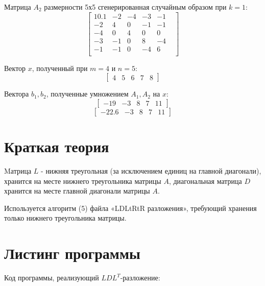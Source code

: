 \documentclass[12pt]{report}
\begin{document}
Матрица $A_{2}$ размерности 5х5 сгенерированная случайным образом при $k = 1$:
\[
\begin{bmatrix}
      10.1 &        -2 &        -4 &        -3 &        -1 & \\
        -2 &         4 &         0 &        -1 &        -1 & \\ 
        -4 &         0 &         4 &         0 &         0 & \\ 
        -3 &        -1 &         0 &         8 &        -4 & \\ 
        -1 &        -1 &         0 &        -4 &         6 & \\
\end{bmatrix}
\]

Вектор $x$, полученный при $m = 4$ и $n = 5$:
\[
\begin{bmatrix}
   4 & 5 & 6 & 7 & 8   
\end{bmatrix}
\]

Вектора $b_{1}, b_{2}$, полученные умножением $A_{1}, A_{2}$ на $x$:
\[
\begin{bmatrix}
   -19 & -3 & 8 & 7 & 11
\end{bmatrix}
\]
\[
\begin{bmatrix}
   -22.6 & -3 & 8 & 7 & 11  
\end{bmatrix}
\]

\section{Краткая теория}

Mатрица $L$ - нижняя треугольная (за исключением единиц на главной диагонали), хранится на месте нижнего треугольника матрицы $A$, диагональная матрица $D$ хранится на месте главной диагонали матрицы $A$.

Используется алгоритм (5) файла «LDLtRtR разложения», требующий хранения только нижнего треугольника матрицы.

\section{Листинг программы}

\lstset{language=Python}
\lstset{extendedchars=\true}

Код программы, реализующий $LDL^{T}$-разложение: 
\end{document}
